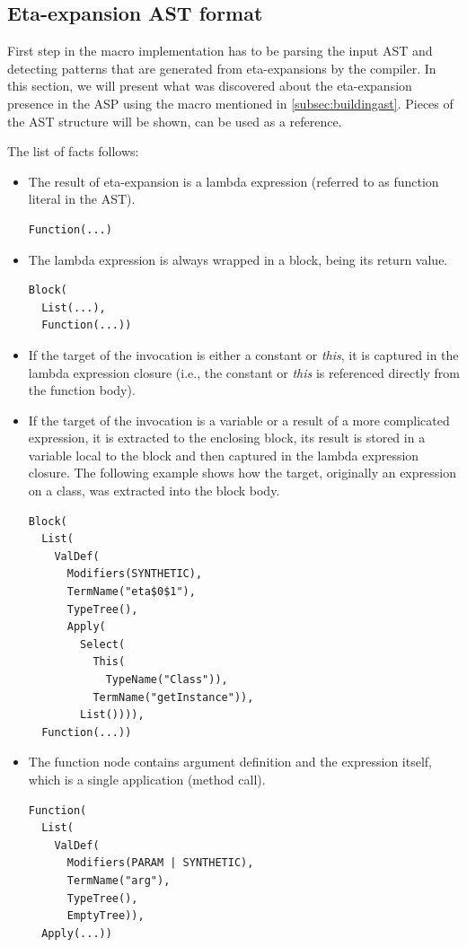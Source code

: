 \subsection{Eta-expansion AST format}

First step in the macro implementation has to be parsing the input AST and detecting patterns that are generated from eta-expansions by the compiler. In this section, we will present what was discovered about the eta-expansion presence in the ASP using the  macro mentioned in \ref{subsec:buildingast}. Pieces of the AST structure will be shown, \cite{noauthor_wolfe:_2017} can be used as a reference.

The list of facts follows:

\begin{itemize}
	\item The result of eta-expansion is a lambda expression (referred to as function literal in the AST).
\lstset{style=Dump}
\begin{lstlisting}
Function(...)
\end{lstlisting}
	\item The lambda expression is always wrapped in a block, being its return value.
	
\lstset{style=Dump}
\begin{lstlisting}
Block(
  List(...), 
  Function(...))
\end{lstlisting}	
	
	\item If the target of the invocation is either a constant or \textit{this}, it is captured in the lambda expression closure (i.e., the constant or \textit{this} is referenced directly from the function body).
	
	\item If the target of the invocation is a variable or a result of a more complicated expression, it is extracted to the enclosing block, its result is stored in a variable local to the block and then captured in the lambda expression closure. The following example shows how the target, originally an expression  on a  class, was extracted into the block body.
	
\lstset{style=Dump}
\begin{lstlisting}
Block(
  List(
    ValDef(
      Modifiers(SYNTHETIC), 
      TermName("eta$0$1"), 
      TypeTree(), 
      Apply(
        Select(
          This(
            TypeName("Class")), 
          TermName("getInstance")), 
        List()))), 
  Function(...))
\end{lstlisting}

	\item The function node contains argument definition and the expression itself, which is a single application (method call).

\lstset{style=Dump}
\begin{lstlisting}
Function(
  List(
    ValDef(
      Modifiers(PARAM | SYNTHETIC), 
      TermName("arg"), 
      TypeTree(), 
      EmptyTree)), 
  Apply(...))
\end{lstlisting}
\end{itemize}

